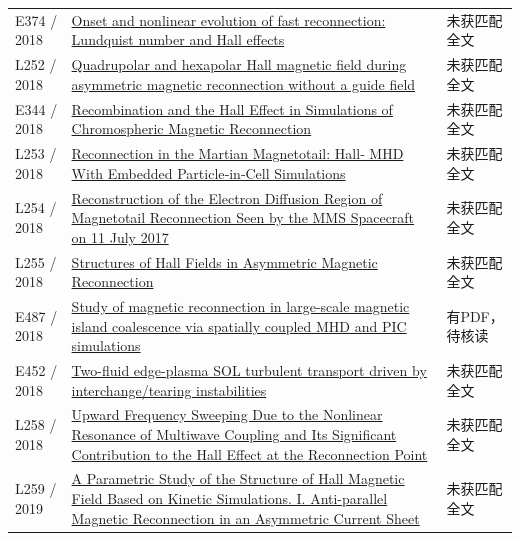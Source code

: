 \begin{longtable}{P{24mm}P{97mm}P{27mm}}
E374 / 2018 & \href{http://ui.adsabs.harvard.edu/abs/2018shin.confE.240S/abstract}{Onset and nonlinear evolution of fast reconnection: Lundquist number and Hall effects} & 未获匹配全文\\

L252 / 2018 & \href{https://doi.org/10.1063/1.5030439}{Quadrupolar and hexapolar Hall magnetic field during asymmetric magnetic reconnection without a guide field} & 未获匹配全文\\

E344 / 2018 & \href{http://ui.adsabs.harvard.edu/abs/2018shin.confE.188M/abstract}{Recombination and the Hall Effect in Simulations of Chromospheric Magnetic Reconnection} & 未获匹配全文\\

L253 / 2018 & \href{https://doi.org/10.1029/2017ja024729}{Reconnection in the Martian Magnetotail: Hall‐ MHD With Embedded Particle‐in‐Cell Simulations} & 未获匹配全文\\

L254 / 2018 & \href{https://doi.org/10.1029/2018ja026051}{Reconstruction of the Electron Diffusion Region of Magnetotail Reconnection Seen by the MMS Spacecraft on 11 July 2017} & 未获匹配全文\\

L255 / 2018 & \href{https://doi.org/10.1029/2018ja025251}{Structures of Hall Fields in Asymmetric Magnetic Reconnection} & 未获匹配全文\\

E487 / 2018 & \href{https://doi.org/10.1063/1.5037774}{Study of magnetic reconnection in large-scale magnetic island coalescence via spatially coupled MHD and PIC simulations} & 有PDF，待核读\\

E452 / 2018 & \href{https://meetings.aps.org/Meeting/DPP18/Session/CO5.1}{Two-fluid edge-plasma SOL turbulent transport driven by interchange/tearing instabilities} & 未获匹配全文\\

L258 / 2018 & \href{https://doi.org/10.1029/2018gl078614}{Upward Frequency Sweeping Due to the Nonlinear Resonance of Multiwave Coupling and Its Significant Contribution to the Hall Effect at the Reconnection Point} & 未获匹配全文\\

L259 / 2019 & \href{https://doi.org/10.3847/1538-4357/ab14ef}{A Parametric Study of the Structure of Hall Magnetic Field Based on Kinetic Simulations. I. Anti-parallel Magnetic Reconnection in an Asymmetric Current Sheet} & 未获匹配全文\\


\end{longtable}

